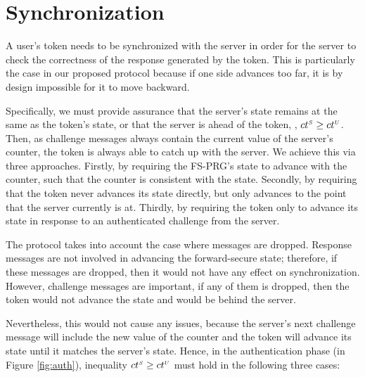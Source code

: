 


\section{Synchronization}
\label{app:synchronisation}

A user's token needs to be synchronized with the server
in order for the server to check the correctness of the response generated by the token.
This is particularly the case in our proposed protocol because
if one side advances too far, it is by design impossible for it to
move backward. 

Specifically, we must provide assurance that the server's state remains at the same as the token's state, or that the server is ahead of the token, \ie, ${ct}^{\scriptscriptstyle S} \geq {ct}^{\scriptscriptstyle U}$. Then, as challenge messages always contain the current value of the server's counter, the token is always able to catch up with the server. We achieve this via three approaches.  Firstly, by requiring the FS-PRG's state to advance with the counter, such that the counter is consistent with the state. Secondly, by requiring that the token never advances its state directly, but only advances to the point that the server currently is at. Thirdly, by requiring the token only to advance its state in response to an authenticated challenge from the server.%


The protocol takes into account the case where messages are dropped.
Response messages are not involved in advancing the forward-secure state; therefore, if these messages are dropped, then it would not have any effect on synchronization. However, challenge messages are important, if any of them is dropped, then the token would not advance the state and would be behind the server. 

Nevertheless, this would not cause any issues, because the server's next challenge message will include the new value of the counter and the token will advance its state until it matches the server's state. Hence, in the authentication phase (in Figure \ref{fig:auth}), inequality ${ct}^{\scriptscriptstyle S} \geq {ct}^{\scriptscriptstyle U}$ must hold in the following three cases:  



